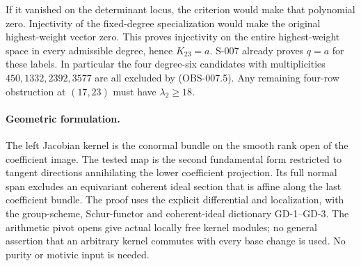 If it vanished on the determinant locus, the criterion would make
that polynomial zero. Injectivity of the fixed-degree specialization
would make the original highest-weight vector zero. This proves
injectivity on the entire highest-weight space in every admissible
degree, hence $K_{23}=a$. S-007 already proves $q=a$ for these labels.
In particular the four degree-six candidates with multiplicities
$450,1332,2392,3577$ are all excluded by (OBS-007.5). Any remaining
four-row obstruction at $(17,23)$ must have $\lambda_2\ge18$.

\paragraph{Geometric formulation.}
The left Jacobian kernel is the conormal bundle on the smooth rank
open of the coefficient image. The tested map is the second
fundamental form restricted to tangent directions annihilating the
lower coefficient projection. Its full normal span excludes an
equivariant coherent ideal section that is affine along the last
coefficient bundle. The proof uses the explicit differential and
localization, with the group-scheme, Schur-functor and coherent-ideal
dictionary GD-1--GD-3. The arithmetic pivot opens give actual locally
free kernel modules; no general assertion that an arbitrary kernel
commutes with every base change is used. No purity or motivic input
is needed.
